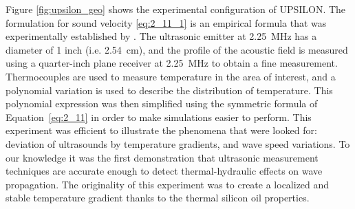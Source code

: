         \begin{table}
\vspace{5truemm}
            \label{table:upsilon_tools}
        \end{table}

            Figure \ref{fig:upsilon_geo} shows the experimental configuration of UPSILON. The formulation for sound velocity \ref{eq:2_11_1} is an empirical formula
that was experimentally established by \cite{Massacret2014Etudedunemethode}. The ultrasonic emitter at \SI{2.25}{\mega\hertz} has a diameter of 1 inch (i.e. \SI{2.54}{\centi\meter}),
and the profile of the acoustic field is measured using a quarter-inch plane receiver at \SI{2.25}{\mega\hertz} to obtain a fine measurement.
            Thermocouples are used to measure temperature in the area of interest, and a polynomial variation is used to describe the distribution of temperature.
This polynomial expression was then simplified using the symmetric formula of Equation~\ref{eq:2_11} in order to make simulations easier to perform.
            This experiment was efficient to illustrate the phenomena that were looked for: deviation of ultrasounds by temperature gradients, and wave speed variations.
To our knowledge it was the first demonstration that ultrasonic measurement techniques are accurate enough to detect thermal-hydraulic effects on wave propagation.
The originality of this experiment was to create a localized and stable temperature gradient thanks to the thermal silicon oil properties.


